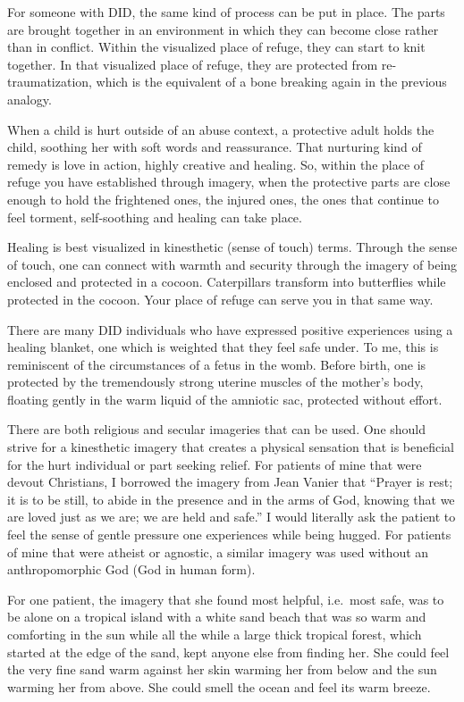 \documentclass[]{book}
\begin{document}
For someone with DID, the same kind of process can be put in place. The parts are brought together in an environment in which they can become close rather than in conflict. Within the visualized place of refuge, they can start to knit together. In that visualized place of refuge, they are protected from re-traumatization, which is the equivalent of a bone breaking again in the previous analogy.

When a child is hurt outside of an abuse context, a protective adult holds the child, soothing her with soft words and reassurance. That nurturing kind of remedy is love in action, highly creative and healing. So, within the place of refuge you have established through imagery, when the protective parts are close enough to hold the frightened ones, the injured ones, the ones that continue to feel torment, self-soothing and healing can take place.

Healing is best visualized in kinesthetic (sense of touch) terms. Through the sense of touch, one can connect with warmth and security through the imagery of being enclosed and protected in a cocoon. Caterpillars transform into butterflies while protected in the cocoon. Your place of refuge can serve you in that same way.

There are many DID individuals who have expressed positive experiences using a healing blanket, one which is weighted that they feel safe under. To me, this is reminiscent of the circumstances of a fetus in the womb. Before birth, one is protected by the tremendously strong uterine muscles of the mother's body, floating gently in the warm liquid of the amniotic sac, protected without effort.

There are both religious and secular imageries that can be used. One should strive for a kinesthetic imagery that creates a physical sensation that is beneficial for the hurt individual or part seeking relief. For patients of mine that were devout Christians, I borrowed the imagery from Jean Vanier that ``Prayer is rest; it is to be still, to abide in the presence and in the arms of God, knowing that we are loved just as we are; we are held and safe.'' I would literally ask the patient to feel the sense of gentle pressure one experiences while being hugged. For patients of mine that were atheist or agnostic, a similar imagery was used without an anthropomorphic God (God in human form).

For one patient, the imagery that she found most helpful, i.e.~most safe, was to be alone on a tropical island with a white sand beach that was so warm and comforting in the sun while all the while a large thick tropical forest, which started at the edge of the sand, kept anyone else from finding her. She could feel the very fine sand warm against her skin warming her from below and the sun warming her from above. She could smell the ocean and feel its warm breeze.
\end{document}
